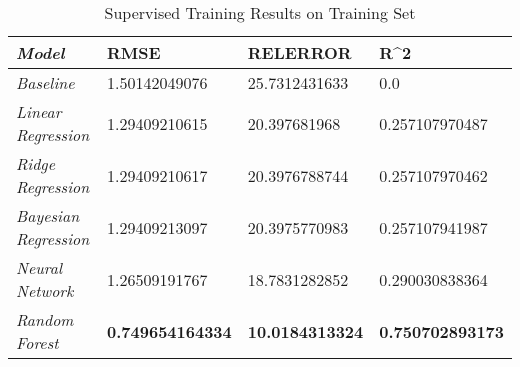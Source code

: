 \documentclass[letterpaper, 10 pt, conference]{ieeeconf}  %
\begin{document}
{\renewcommand{\arraystretch}{2}%
\begin{table*}[]
\centering
\caption{Supervised Training Results on Training Set}
\label{table:trainint_set_results}
\begin{tabular}{|l|lll}
\hline
\textit{\textbf{Model}}      & \multicolumn{1}{l|}{\textbf{RMSE}} & \multicolumn{1}{l|}{\textbf{RELERROR}} & \multicolumn{1}{l|}{\textbf{R\textasciicircum 2}} \\ \hline
\textit{Baseline}            & 1.50142049076                      & 25.7312431633                          & 0.0                                               \\ \cline{1-1}
\textit{Linear Regression}   & 1.29409210615                      & 20.397681968                           & 0.257107970487                                    \\ \cline{1-1}
\textit{Ridge Regression}    & 1.29409210617                      & 20.3976788744                          & 0.257107970462                                    \\ \cline{1-1}
\textit{Bayesian Regression} & 1.29409213097                      & 20.3975770983                          & 0.257107941987                                    \\ \cline{1-1}
\textit{Neural Network}      & 1.26509191767                      & 18.7831282852                          & 0.290030838364                                    \\ \cline{1-1}
\textit{Random Forest}       & \textbf{0.749654164334}            & \textbf{10.0184313324}                 & \textbf{0.750702893173}                           \\ \cline{1-1}
\end{tabular}
\end{table*}
}

\end{document}
